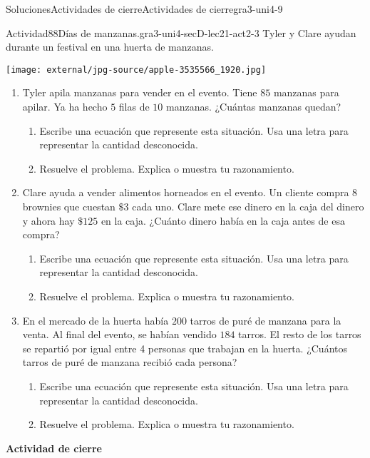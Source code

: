 \documentclass[twoside,10pt,]{article}
\begin{document}
\begin{solutions-section}{Soluciones}{Actividades de cierre}{}{Actividades de cierre}{}{}{gra3-uni4-9}
\begin{activitysolution}{Actividad}{88}{Días de manzanas.}{gra3-uni4-secD-lec21-act2-3}%
Tyler y Clare ayudan durante un festival en una huerta de manzanas.%
\begin{image}{0.25}{0.5}{0.25}{}%
\texttt{[image: external/jpg-source/apple-3535566\_1920.jpg]}
\end{image}%
%
\begin{enumerate}
\item{}Tyler apila manzanas para vender en el evento. Tiene \(85\) manzanas para apilar. Ya ha hecho \(5\) filas de \(10\) manzanas. ¿Cuántas manzanas quedan?%
%
\begin{enumerate}
\item{}Escribe una ecuación que represente esta situación. Usa una letra para representar la cantidad desconocida.%
\item{}Resuelve el problema. Explica o muestra tu razonamiento.%
\end{enumerate}
\item{}Clare ayuda a vender alimentos horneados en el evento. Un cliente compra \(8\) brownies que cuestan \(\$3\) cada uno. Clare mete ese dinero en la caja del dinero y ahora hay \(\$125\) en la caja. ¿Cuánto dinero había en la caja antes de esa compra?%
%
\begin{enumerate}
\item{}Escribe una ecuación que represente esta situación. Usa una letra para representar la cantidad desconocida.%
\item{}Resuelve el problema. Explica o muestra tu razonamiento.%
\end{enumerate}
\item{}En el mercado de la huerta había \(200\) tarros de puré de manzana para la venta. Al final del evento, se habían vendido \(184\) tarros. El resto de los tarros se repartió por igual entre 4 personas que trabajan en la huerta. ¿Cuántos tarros de puré de manzana recibió cada persona?%
%
\begin{enumerate}
\item{}Escribe una ecuación que represente esta situación. Usa una letra para representar la cantidad desconocida.%
\item{}Resuelve el problema. Explica o muestra tu razonamiento.%
\end{enumerate}
\end{enumerate}
\end{activitysolution}%
\par\medskip
\noindent\textbf{\large{}\space\textperiodcentered\space{}Actividad de cierre}

\end{solutions-section}
\end{document}

